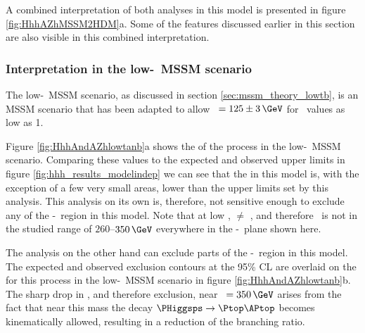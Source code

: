 A combined interpretation of both analyses in this model is presented
in figure \ref{fig:HhhAZhMSSM2HDM}a. Some of the features discussed earlier
in this section are also visible in this combined interpretation.


\subsubsection{Interpretation in the low-\tanb~MSSM scenario}
\label{sec:hhh_results_modeldep_lowtb}
The low-\tanb~MSSM scenario, as discussed in section \ref{sec:mssm_theory_lowtb},
is an \ac{MSSM} scenario that has been adapted to allow \mh~$=125 \pm 3\,\GeV$ for \tanb~values
as low as 1.  

Figure \ref{fig:HhhAndAZhlowtanb}a shows the \xsbr 
of the \Htohhtobbtautau process in the low-\tanb~MSSM scenario. Comparing these values 
to the expected and observed upper limits in figure \ref{fig:hhh_results_modelindep} we 
can see that the \xsbr in this model is, with the exception of a few very small 
areas, lower than the upper limits set by this analysis. This analysis on its own is,
therefore, not sensitive enough to exclude any of the \mA-\tanb~region in this model. Note that
at low \tanb, \mA$\neq$ \mH, and therefore \mH~is not in the studied range of $260$--$350\,\GeV$
everywhere in the \mA-\tanb~plane shown here.

The \AtoZhtolltautau analysis on the other hand can exclude parts of the \mA-\tanb~region
in this model. The expected and observed exclusion contours at the 95\% \ac{CL} are overlaid 
on the \xsbr for this process in the low-\tanb~MSSM scenario in  
figure \ref{fig:HhhAndAZhlowtanb}b. The sharp drop in \xsbr, and therefore exclusion,
near \mA~$ = 350\,\GeV$ arises from the fact that near this mass the decay $\PHiggsps \rightarrow \Ptop\APtop$ becomes
kinematically allowed, resulting in a reduction of the \AtoZh branching ratio.


